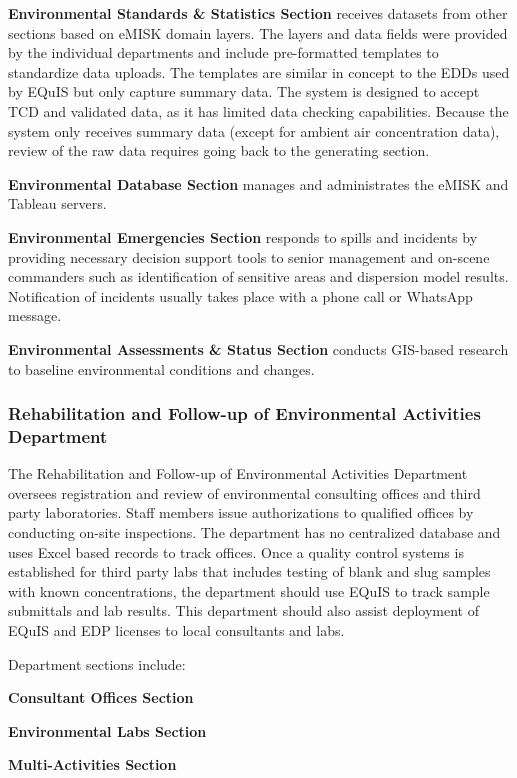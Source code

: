 \textbf{Environmental Standards \& Statistics Section} receives datasets from other sections based on eMISK domain layers. The layers and data fields were provided by the individual departments and include pre-formatted templates to standardize data uploads. The templates are similar in concept to the EDDs used by EQuIS but only capture summary data. The system is designed to accept TCD and validated data, as it has limited data checking capabilities. Because the system only receives summary data (except for ambient air concentration data), review of the raw data requires going back to the generating section.

\textbf{Environmental Database Section} manages and administrates the eMISK and Tableau servers.

\textbf{Environmental Emergencies Section} responds to spills and incidents by providing necessary decision support tools to senior management and on-scene commanders such as identification of sensitive areas and dispersion model results. Notification of incidents usually takes place with a phone call or WhatsApp message.

\textbf{Environmental Assessments \& Status Section} conducts GIS-based research to baseline environmental conditions and changes.

\subsubsection{Rehabilitation and Follow-up of Environmental Activities  Department}

The Rehabilitation and Follow-up of Environmental Activities Department oversees registration and review of environmental consulting offices and third party laboratories. Staff members issue authorizations to qualified offices by conducting on-site inspections. The department has no centralized database and uses Excel based records to track offices. Once a quality control systems is established for third party labs that includes testing of blank and slug samples with known concentrations, the department should use EQuIS to track sample submittals and lab results. This department should also assist deployment of EQuIS and EDP licenses to local consultants and labs.

Department sections include:

\textbf{Consultant Offices Section}

\textbf{Environmental Labs Section}

\textbf{Multi-Activities Section}


